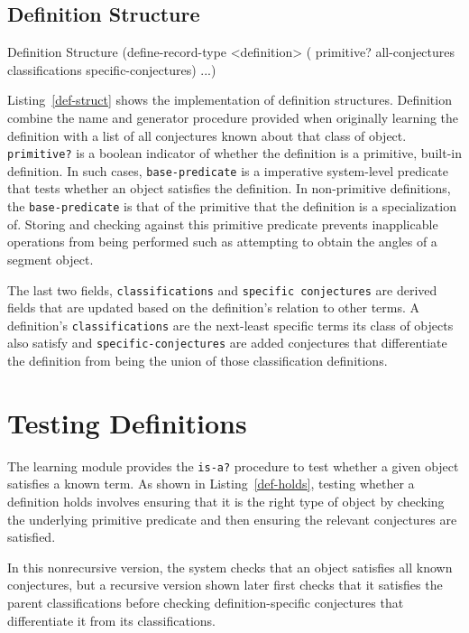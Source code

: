\subsection{Definition Structure}

\begin{code-listing}
[label=def-struct]
{Definition Structure}
(define-record-type <definition>
  (%
                     primitive?
                     all-conjectures
                     classifications specific-conjectures) ...)
\end{code-listing}

Listing~\ref{def-struct} shows the implementation of definition
structures. Definition combine the name and generator procedure
provided when originally learning the definition with a list of all
conjectures known about that class of object. \texttt{primitive?} is a
boolean indicator of whether the definition is a primitive, built-in
definition. In such cases, \texttt{base-predicate} is a imperative
system-level predicate that tests whether an object satisfies the
definition. In non-primitive definitions, the \texttt{base-predicate}
is that of the primitive that the definition is a specialization
of. Storing and checking against this primitive predicate prevents
inapplicable operations from being performed such as attempting to
obtain the angles of a segment object.

The last two fields, \texttt{classifications} and \texttt{specific
  conjectures} are derived fields that are updated based on the
definition's relation to other terms. A definition's
\texttt{classifications} are the next-least specific terms its class
of objects also satisfy and \texttt{specific-conjectures} are added
conjectures that differentiate the definition from being the union of
those classification definitions.


\section{Testing Definitions}

The learning module provides the \texttt{is-a?} procedure to test
whether a given object satisfies a known term. As shown in
Listing~\ref{def-holds}, testing whether a definition holds involves
ensuring that it is the right type of object by checking the
underlying primitive predicate and then ensuring the relevant
conjectures are satisfied.

In this nonrecursive version, the system checks that an object
satisfies all known conjectures, but a recursive version shown later
first checks that it satisfies the parent classifications before
checking definition-specific conjectures that differentiate it from
its classifications.


